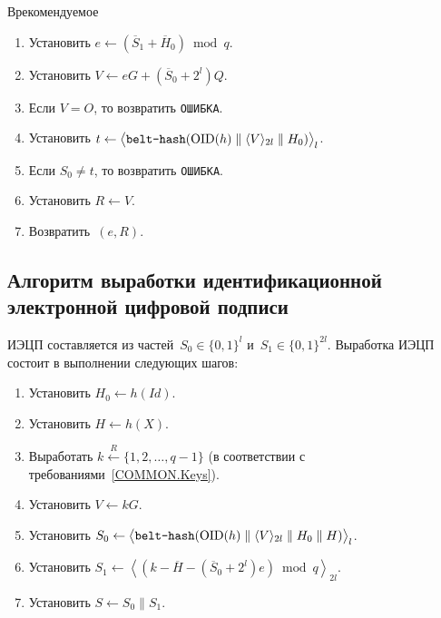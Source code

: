 \begin{appendix}{В}{рекомендуемое}
\begin{enumerate}
\item
Установить $e\leftarrow(\overline{S}_1+\overline{H}_0)\bmod q$.

\item
Установить
$V\leftarrow eG + (\overline{S}_0+2^{l})Q$.

\item
Если $V=O$, то возвратить \texttt{ОШИБКА}.

\item
Установить $t\leftarrow
\bigl\langle\texttt{belt-hash}
(\text{\normalfont OID}(h)\parallel\langle V\rangle_{2l}\parallel H_0)
\bigr\rangle_l$.

\item
Если $S_0\neq t$,
то возвратить \texttt{ОШИБКА}.

\item
Установить $R\leftarrow V$.

\item
Возвратить~$(e,R)$.
\end{enumerate}

\subsection{Алгоритм выработки идентификационной 
электронной цифровой подписи}\label{IBS.Sign}

ИЭЦП составляется из 
частей~$S_0\in\{0,1\}^{l}$ и~$S_1\in\{0,1\}^{2l}$. 
Выработка ИЭЦП состоит в выполнении следующих шагов:
\begin{enumerate}
\item
Установить $H_0\leftarrow h(Id)$.

\item
Установить $H\leftarrow h(X)$.

\item
Выработать
$k\stackrel{R}{\leftarrow}\{1,2,\ldots,q-1\}$
(в соответствии с требованиями~\ref{COMMON.Keys}).

\item
Установить $V\leftarrow kG$.

\item
Установить
$S_0\leftarrow
\bigl\langle\texttt{belt-hash}
(\text{\normalfont OID}(h)\parallel\langle V\rangle_{2l}\parallel H_0\parallel H)
\bigr\rangle_l$.

\item
Установить
$S_1\leftarrow\left\langle(k-\overline{H}-(\overline{S}_0+2^{l})e)\bmod q
\right\rangle_{2l}$.

\item
Установить $S\leftarrow S_0\parallel S_1$.


\end{enumerate}
\end{appendix}
